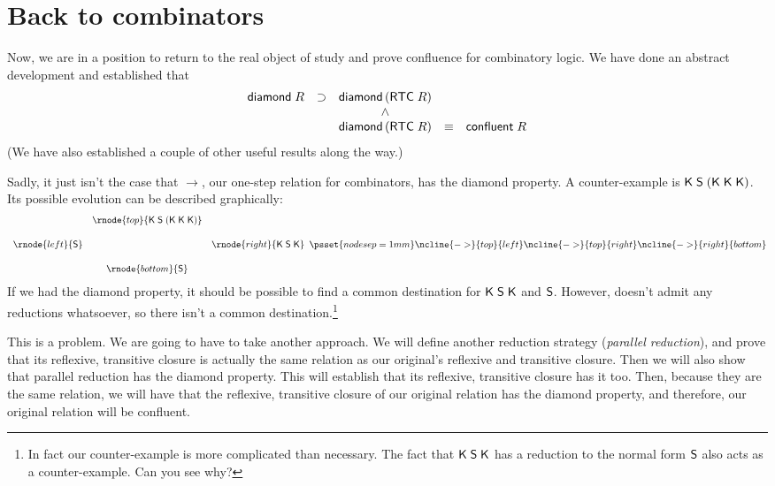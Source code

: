 \section{Back to combinators}
\label{sec:Return-to-Land}

Now, we are in a position to return to the real object of study and
prove confluence for combinatory logic.  We have done an abstract
development and established that\[
\begin{array}{ccccc}
{\sf diamond}\;R & \supset & {\sf diamond}\,({\sf RTC}\;R)\\
& & \land\\
& & {\sf diamond}\,({\sf RTC}\;R) & \equiv & {\sf confluent}\;R\\
\end{array}
\]  (We have also established a couple of other useful results along
the way.)

\newcommand{\topk}{\KC\;\SC\;(\KC\;\KC\;\KC)} Sadly, it just isn't the
case that $\rightarrow$, our one-step relation for combinators, has
the diamond property.  A counter-example is $\topk$.  Its possible evolution
can be described graphically: \[
\begin{array}{ccc}
& \rnode{top}{\topk}\\[5mm]
\rnode{left}{\SC} & & \rnode{right}{\KC\;\SC\;\KC}\\[5mm]
& \rnode{bottom}{\SC}
\end{array}
\psset{nodesep=1mm}
\ncline{->}{top}{left}
\ncline{->}{top}{right}
\ncline{->}{right}{bottom}
\]
If we had the diamond property, it should be possible to find a common
destination for ${\sf K}\;{\sf S}\;{\sf K}$ and ${\sf S}$.  However, \SC{} doesn't
admit any reductions whatsoever, so there isn't a common
destination.\footnote{In fact our counter-example is more complicated
  than necessary.  The fact that ${\sf K}\;{\sf S}\;{\sf K}$ has a
  reduction to the normal form ${\sf S}$ also acts as a counter-example.
  Can you see why?}

This is a problem.  We are going to have to take another approach.
We will define another reduction strategy (\emph{parallel reduction}),
and prove that its reflexive, transitive closure is actually the same
relation as our original's reflexive and transitive closure.  Then we
will also show that parallel reduction has the diamond property.  This
will establish that its reflexive, transitive closure has it too.
Then, because they are the same relation, we will have that the
reflexive, transitive closure of our original relation has the diamond
property, and therefore, our original relation will be confluent.

